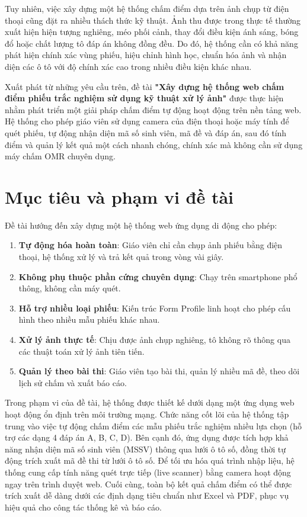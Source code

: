 Tuy nhiên, việc xây dựng một hệ thống chấm điểm dựa trên ảnh chụp từ điện thoại cũng đặt ra nhiều thách thức kỹ thuật. Ảnh thu được trong thực tế thường xuất hiện hiện tượng nghiêng, méo phối cảnh, thay đổi điều kiện ánh sáng, bóng đổ hoặc chất lượng tô đáp án không đồng đều. Do đó, hệ thống cần có khả năng phát hiện chính xác vùng phiếu, hiệu chỉnh hình học, chuẩn hóa ảnh và nhận diện các ô tô với độ chính xác cao trong nhiều điều kiện khác nhau.

Xuất phát từ những yêu cầu trên, đề tài \textbf{"Xây dựng hệ thống web chấm điểm phiếu trắc nghiệm sử dụng kỹ thuật xử lý ảnh"} được thực hiện nhằm phát triển một giải pháp chấm điểm tự động hoạt động trên nền tảng web. Hệ thống cho phép giáo viên sử dụng camera của điện thoại hoặc máy tính để quét phiếu, tự động nhận diện mã số sinh viên, mã đề và đáp án, sau đó tính điểm và quản lý kết quả một cách nhanh chóng, chính xác mà không cần sử dụng máy chấm OMR chuyên dụng.

\section{Mục tiêu và phạm vi đề tài}
Đề tài hướng đến xây dựng một hệ thống web ứng dụng di động cho phép:

\begin{enumerate}
    \item \textbf{Tự động hóa hoàn toàn}: Giáo viên chỉ cần chụp ảnh phiếu bằng điện thoại, hệ thống xử lý và trả kết quả trong vòng vài giây.
    \item \textbf{Không phụ thuộc phần cứng chuyên dụng}: Chạy trên smartphone phổ thông, không cần máy quét.
    \item \textbf{Hỗ trợ nhiều loại phiếu}: Kiến trúc Form Profile linh hoạt cho phép cấu hình theo nhiều mẫu phiếu khác nhau.
    \item \textbf{Xử lý ảnh thực tế}: Chịu được ảnh chụp nghiêng, tô không rõ thông qua các thuật toán xử lý ảnh tiên tiến.
    \item \textbf{Quản lý theo bài thi}: Giáo viên tạo bài thi, quản lý nhiều mã đề, theo dõi lịch sử chấm và xuất báo cáo.
\end{enumerate}

Trong phạm vi của đề tài, hệ thống được thiết kế dưới dạng một ứng dụng web hoạt động ổn định trên môi trường mạng. Chức năng cốt lõi của hệ thống tập trung vào việc tự động chấm điểm các mẫu phiếu trắc nghiệm nhiều lựa chọn (hỗ trợ các dạng 4 đáp án A, B, C, D). Bên cạnh đó, ứng dụng được tích hợp khả năng nhận diện mã số sinh viên (MSSV) thông qua lưới ô tô số, đồng thời tự động trích xuất mã đề thi từ lưới ô tô số. Để tối ưu hóa quá trình nhập liệu, hệ thống cung cấp tính năng quét trực tiếp (live scanner) bằng camera hoạt động ngay trên trình duyệt web. Cuối cùng, toàn bộ kết quả chấm điểm có thể được trích xuất dễ dàng dưới các định dạng tiêu chuẩn như Excel và PDF, phục vụ hiệu quả cho công tác thống kê và báo cáo.
